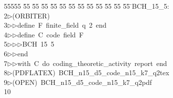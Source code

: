 %
%
\begin{tabbing}
55555 \= 55 \= 55 \= 55 \= 55 \= 55 \= 55 \= 55 \= 55 \= 55 \= 55 \= 55 \= 55 \= \>BCH\_15\_5:\\[0pt]
2\>$\triangleright$\>(ORBITER)\ \\[0pt]
3\>$\triangleright$\>$\triangleright$\>define\ F\ finite\_field\ q\ 2\ end\ \\[0pt]
4\>$\triangleright$\>$\triangleright$\>define\ C\ code\ field\ F\ \\[0pt]
5\>$\triangleright$\>$\triangleright$\>$\triangleright$\>BCH\ 15\ 5\ \\[0pt]
6\>$\triangleright$\>$\triangleright$\>end\ \\[0pt]
7\>$\triangleright$\>$\triangleright$\>with\ C\ do\ coding\_theoretic\_activity\ report\ end\\[0pt]
8\>$\triangleright$\>(PDFLATEX)\ BCH\_n15\_d5\_code\_n15\_k7\_q2tex\\[0pt]
9\>$\triangleright$\>(OPEN)\ BCH\_n15\_d5\_code\_n15\_k7\_q2pdf\\[0pt]
10\>\end{tabbing}
